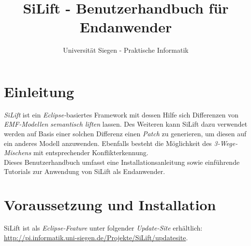 \documentclass[a4paper]{scrartcl}
\begin{document}
\title{SiLift - Benutzerhandbuch für Endanwender}
\author{Universität Siegen - Praktische Informatik}


\maketitle



\newpage

\tableofcontents
\newpage

\section{Einleitung}

\textit{SiLift} ist ein \textit{Eclipse-}basiertes Framework mit dessen Hilfe sich Differenzen von \textit{EMF-Modellen} \textit{semantisch liften} lassen.
Des Weiteren kann SiLift dazu verwendet werden auf Basis einer solchen Differenz einen \textit{Patch} zu generieren, um diesen auf ein anderes Modell anzuwenden.
Ebenfalls besteht die Möglichkeit des \textit{3-Wege-Mischens} mit entsprechender Konflikterkennung.\\
Dieses Benutzerhandbuch umfasst eine Installationsanleitung sowie einführende Tutorials zur Anwendung von SiLift als Endanwender.
\section{Voraussetzung und Installation}

SiLift ist als \textit{Eclipse-Feature} unter folgender \textit{Update-Site} erhältlich:\\ \url{http://pi.informatik.uni-siegen.de/Projekte/SiLift/updatesite}.\\
\end{document}
